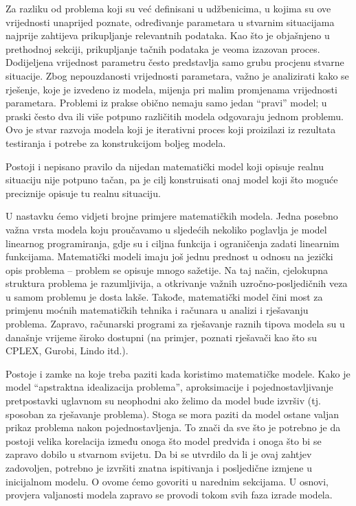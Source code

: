 \documentclass[a4paper, utf8, 11pt, colorlinks]{book}
\begin{document}
Za razliku od problema koji su već definisani u udžbenicima, u kojima su ove vrijednosti unaprijed poznate,   određivanje parametara u stvarnim situacijama najprije zahtijeva prikupljanje relevantnih podataka. Kao što je objašnjeno u prethodnoj sekciji,  prikupljanje tačnih podataka je veoma izazovan proces.  Dodijeljena vrijednost parametru često predstavlja  samo grubu procjenu stvarne situacije. Zbog nepouzdanosti vrijednosti parametara, važno je analizirati kako se rješenje, koje je izvedeno iz modela, mijenja pri malim promjenama vrijednosti parametara. 
 Problemi iz prakse obično nemaju samo jedan ``pravi'' model; u praski   često   dva ili više potpuno različitih modela odgovaraju jednom problemu. 
Ovo je stvar razvoja modela koji je iterativni proces koji proizilazi iz rezultata testiranja i potrebe za konstrukcijom boljeg modela.

Postoji i nepisano pravilo da nijedan matematički model koji opisuje realnu situaciju nije potpuno tačan, pa je cilj konstruisati onaj model koji  što moguće preciznije opisuje tu realnu situaciju.


 U nastavku  ćemo vidjeti brojne primjere matematičkih modela. Jedna posebno važna vrsta modela koju proučavamo u sljedećih nekoliko poglavlja
je model linearnog programiranja, gdje su i ciljna funkcija i ograničenja zadati linearnim funkcijama. 
Matematički modeli imaju još jednu prednost u odnosu na jezički opis problema -- problem se opisuje mnogo sažetije. Na taj način, cjelokupna struktura problema je razumljivija, a otkrivanje važnih uzročno-posljedičnih veza u samom problemu je dosta lakše. Takođe, matematički
model čini most za primjenu moćnih matematičkih tehnika i računara u
analizi i rješavanju problema. Zapravo, računarski programi za rješavanje raznih tipova modela su  u današnje vrijeme  široko dostupni (na primjer, poznati rješavači kao što su CPLEX, Gurobi, Lindo itd.). 

  Postoje i zamke na koje treba paziti kada koristimo matematičke modele. Kako je model ``apstraktna idealizacija problema'', aproksimacije i pojednostavljivanje pretpostavki uglavnom su neophodni ako želimo da model bude izvršiv (tj. sposoban za rješavanje problema). Stoga se mora paziti da model ostane valjan prikaz problema nakon pojednostavljenja. To znači da 
  sve što je potrebno je da postoji velika korelacija između onoga što model predviđa i onoga što bi se zapravo dobilo u stvarnom svijetu. Da bi se utvrdilo da li je ovaj zahtjev zadovoljen, potrebno je izvršiti znatna ispitivanja i posljedične izmjene u inicijalnom modelu. O ovome ćemo govoriti u narednim sekcijama. U osnovi, provjera valjanosti modela zapravo se provodi tokom svih  faza izrade modela. 
  
\end{document}

